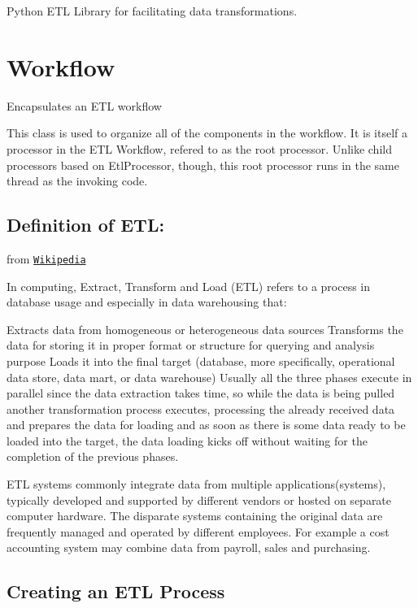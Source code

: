 Python E\-T\-L Library for facilitating data transformations.

\section*{Workflow }

Encapsulates an E\-T\-L workflow

This class is used to organize all of the components in the workflow. It is itself a processor in the E\-T\-L Workflow, refered to as the root processor. Unlike child processors based on Etl\-Processor, though, this root processor runs in the same thread as the invoking code.

\subsection*{Definition of E\-T\-L\-: }

from \href{http://en.wikipedia.org/wiki/Extract,_transform,_load}{\tt Wikipedia}

In computing, Extract, Transform and Load (E\-T\-L) refers to a process in database usage and especially in data warehousing that\-:

Extracts data from homogeneous or heterogeneous data sources Transforms the data for storing it in proper format or structure for querying and analysis purpose Loads it into the final target (database, more specifically, operational data store, data mart, or data warehouse) Usually all the three phases execute in parallel since the data extraction takes time, so while the data is being pulled another transformation process executes, processing the already received data and prepares the data for loading and as soon as there is some data ready to be loaded into the target, the data loading kicks off without waiting for the completion of the previous phases.

E\-T\-L systems commonly integrate data from multiple applications(systems), typically developed and supported by different vendors or hosted on separate computer hardware. The disparate systems containing the original data are frequently managed and operated by different employees. For example a cost accounting system may combine data from payroll, sales and purchasing.

\subsection*{Creating an E\-T\-L Process }

